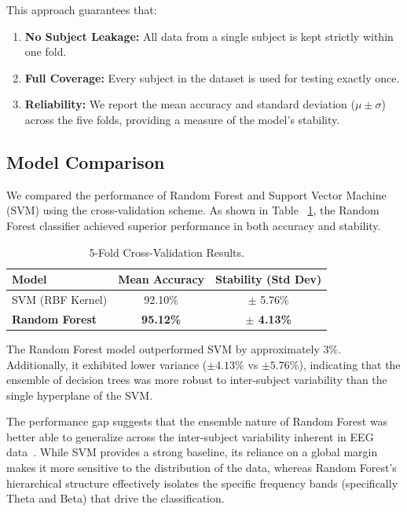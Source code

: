 \documentclass[11pt,a4paper]{article}
\begin{document}
This approach guarantees that:
\begin{enumerate}
    \item \textbf{No Subject Leakage:} All data from a single subject is kept strictly within one fold.
    \item \textbf{Full Coverage:} Every subject in the dataset is used for testing exactly once.
    \item \textbf{Reliability:} We report the mean accuracy and standard deviation ($\mu \pm \sigma$) across the five folds, providing a 
    measure of the model's stability.
\end{enumerate}

\subsection{Model Comparison}
We compared the performance of Random Forest and Support Vector Machine (SVM) using the cross-validation scheme. As shown in Table
~\ref{tab:cv_results}, the Random Forest classifier achieved superior performance in both accuracy and stability.

\begin{table}[H]
    \centering
    \begin{tabular}{lcc}
        \toprule
        \textbf{Model} & \textbf{Mean Accuracy} & \textbf{Stability (Std Dev)} \\
        \midrule
        SVM (RBF Kernel) & 92.10\% & $\pm$ 5.76\% \\
        \textbf{Random Forest} & \textbf{95.12\%} & \textbf{$\pm$ 4.13\%} \\
        \bottomrule
    \end{tabular}
    \caption{5-Fold Cross-Validation Results.}
    \label{tab:cv_results}
\end{table}

The Random Forest model outperformed SVM by approximately 3\%. Additionally, it exhibited lower variance ($\pm 4.13\%$ vs $\pm 5.76\%$), 
indicating that the ensemble of decision trees was more robust to inter-subject variability than the single hyperplane of the SVM.

The performance gap suggests that the ensemble nature of Random Forest was better able to generalize across the inter-subject variability 
inherent in EEG data~\cite{tenev2014machine}. While SVM provides a strong baseline, its reliance on a global margin makes it more sensitive to 
the distribution of the data, whereas Random Forest's hierarchical structure effectively isolates the specific frequency bands (specifically 
Theta and Beta) that drive the classification.
\end{document}
